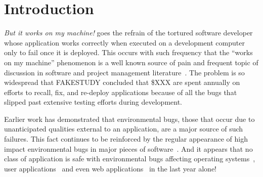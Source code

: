 \section{Introduction}
\label{SEC:introduction}

\textit{But it works on my machine!} goes the refrain of the tortured
software developer whose application works correctly when executed on a
development computer only to fail once it is deployed.  This occurs with
such frequency that the ``works on my machine'' phenomenon is a well known
source of pain
and frequent topic of discussion
in software and project management
literature~\cite{notreal}.
The problem is so widespread
that FAKESTUDY concluded
that \$XXX are spent annually on efforts to
recall,
fix,
and re-deploy applications
because of all the bugs
that slipped past extensive testing efforts
during development.

Earlier work has demonstrated that environmental bugs, those that occur due
to unanticipated qualities external to an application, are a major source
of such failures.  This fact continues to be reinforced by the regular
appearance of high impact environmental bugs in major pieces of
software~\cite{devzeroroot}.  And it appears that no class of application
is safe with environmental bugs affecting operating systems~\cite{bad},
user applications~\cite{bad} and even web applications~\cite{bad} in the
last year alone!




